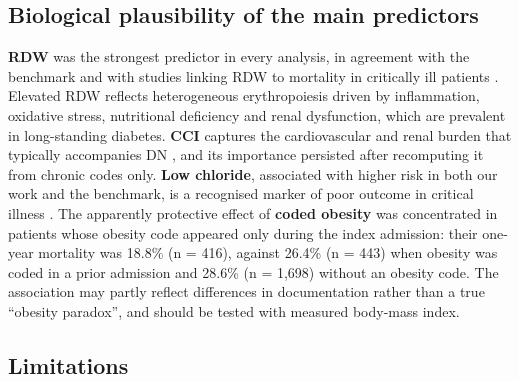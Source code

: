 \hypertarget{biological-plausibility-of-the-main-predictors}{%
\subsection{Biological plausibility of the main
predictors}\label{biological-plausibility-of-the-main-predictors}}

\textbf{RDW} was the strongest predictor in every analysis, in agreement with
the benchmark and with studies linking RDW to mortality in critically ill
patients \parencite{bazick2011}. Elevated RDW reflects heterogeneous
erythropoiesis driven by inflammation, oxidative stress, nutritional deficiency
and renal dysfunction, which are prevalent in long-standing diabetes.
\textbf{CCI} captures the cardiovascular and renal burden that typically
accompanies DN \parencite{feldman2019}, and its importance persisted after
recomputing it from chronic codes only. \textbf{Low chloride}, associated with
higher risk in both our work and the benchmark, is a recognised marker of poor
outcome in critical illness \parencite{tani2012}. The apparently protective
effect of \textbf{coded obesity} was concentrated in patients whose obesity code
appeared only during the index admission: their one-year mortality was 18.8\% (n
= 416), against 26.4\% (n = 443) when obesity was coded in a prior admission and
28.6\% (n = 1,698) without an obesity code. The association may partly reflect
differences in documentation rather than a true ``obesity paradox'', and should
be tested with measured body-mass index.

\hypertarget{limitations}{%
\subsection{Limitations}\label{limitations}}

